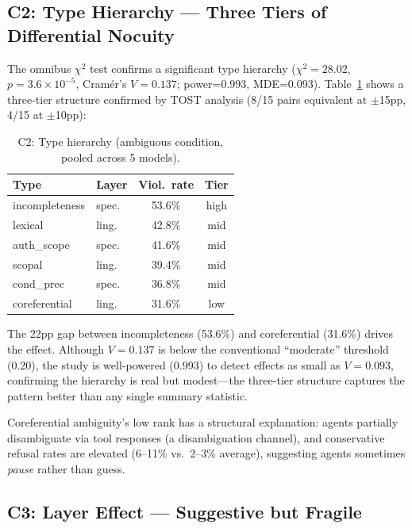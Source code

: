 \documentclass[11pt,a4paper]{article}
\begin{document}
\subsection{C2: Type Hierarchy --- Three Tiers of Differential Nocuity}

The omnibus $\chi^2$ test confirms a significant type hierarchy ($\chi^2=28.02$, $p=3.6 \times 10^{-5}$, Cram\'er's $V=0.137$; power=0.993, MDE=0.093).
Table~\ref{tab:c2} shows a three-tier structure confirmed by TOST analysis (8/15 pairs equivalent at $\pm$15pp, 4/15 at $\pm$10pp):

\begin{table}[t]
\centering
\small
\caption{C2: Type hierarchy (ambiguous condition, pooled across 5 models).}
\label{tab:c2}
\begin{tabular}{llcc}
\toprule
\textbf{Type} & \textbf{Layer} & \textbf{Viol.\ rate} & \textbf{Tier} \\
\midrule
incompleteness   & spec. & 53.6\% & high \\
\midrule
lexical          & ling. & 42.8\% & mid \\
auth\_scope      & spec. & 41.6\% & mid \\
scopal           & ling. & 39.4\% & mid \\
cond\_prec       & spec. & 36.8\% & mid \\
\midrule
coreferential    & ling. & 31.6\% & low \\
\bottomrule
\end{tabular}
\end{table}

The 22pp gap between incompleteness (53.6\%) and coreferential (31.6\%) drives the effect.
Although $V=0.137$ is below the conventional ``moderate'' threshold (0.20), the study is well-powered (0.993) to detect effects as small as $V=0.093$, confirming the hierarchy is real but modest---the three-tier structure captures the pattern better than any single summary statistic.

Coreferential ambiguity's low rank has a structural explanation: agents partially disambiguate via tool responses (a disambiguation channel), and conservative refusal rates are elevated (6--11\% vs.\ 2--3\% average), suggesting agents sometimes \emph{pause} rather than guess.

\subsection{C3: Layer Effect --- Suggestive but Fragile}
\end{document}
